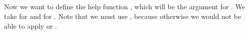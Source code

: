 \begin{code}%
\>[0]\AgdaSpace{}%
\AgdaSymbol{:}\AgdaSpace{}%
\AgdaSymbol{\{}\AgdaSpace{}%
\AgdaSpace{}%
\AgdaSymbol{:}\AgdaSpace{}%
\AgdaSymbol{\}}\AgdaSpace{}%
\AgdaSpace{}%
\AgdaFunction{\&}\AgdaSymbol{(}\AgdaSpace{}%
\AgdaSpace{}%
\AgdaSpace{}%
\AgdaSpace{}%
\AgdaSpace{}%
\AgdaSymbol{)}\AgdaSpace{}%
\AgdaSpace{}%
\AgdaFunction{\&}\AgdaSymbol{(}\AgdaSymbol{(}\AgdaSpace{}%
\AgdaSpace{}%
\AgdaSymbol{)}\AgdaSpace{}%
\AgdaSpace{}%
\AgdaSpace{}%
\AgdaSpace{}%
\AgdaSymbol{)}\<%
\\
\>[0]\AgdaSpace{}%
\AgdaSpace{}%
\AgdaSpace{}%
\AgdaSymbol{=}\AgdaSpace{}%
\AgdaSpace{}%
\AgdaSymbol{(}\AgdaSpace{}%
\AgdaSpace{}%
\AgdaSpace{}%
\AgdaSymbol{)}\<%
\\
%
\\[\AgdaEmptyExtraSkip]%
\>[0]\AgdaSpace{}%
\AgdaSymbol{:}\AgdaSpace{}%
\AgdaSymbol{\{}\AgdaSpace{}%
\AgdaSpace{}%
\AgdaSymbol{:}\AgdaSpace{}%
\AgdaSymbol{\}}\AgdaSpace{}%
\AgdaSpace{}%
\AgdaFunction{\&}\AgdaSymbol{(}\AgdaSpace{}%
\AgdaSpace{}%
\AgdaSpace{}%
\AgdaSpace{}%
\AgdaSpace{}%
\AgdaSymbol{)}\AgdaSpace{}%
\AgdaSpace{}%
\AgdaFunction{\&}\AgdaSpace{}%
\<%
\\
\>[0]\AgdaSpace{}%
\AgdaSpace{}%
\AgdaSymbol{=}\AgdaSpace{}%
\AgdaSpace{}%
\AgdaSymbol{(}\AgdaSpace{}%
\AgdaSymbol{(}\AgdaSpace{}%
\AgdaSymbol{))}\<%
\end{code}

Now we want to define the help function , which will be the argument for .
We take  for  and  for .
Note that we must use , because otherwise we would not be able to apply  or .

